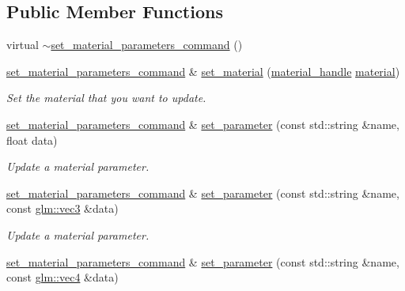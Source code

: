 \subsection*{Public Member Functions}
\begin{DoxyCompactItemize}
\item 
virtual \mbox{\hyperlink{classmoka_1_1set__material__parameters__command_a0b064dd9f44c8a9dbabe5e23edcf632c}{$\sim$set\+\_\+material\+\_\+parameters\+\_\+command}} ()
\item 
\mbox{\hyperlink{classmoka_1_1set__material__parameters__command}{set\+\_\+material\+\_\+parameters\+\_\+command}} \& \mbox{\hyperlink{classmoka_1_1set__material__parameters__command_a94146b37e0add82e19ca6dd254d02fed}{set\+\_\+material}} (\mbox{\hyperlink{structmoka_1_1material__handle}{material\+\_\+handle}} \mbox{\hyperlink{classmoka_1_1material}{material}})
\begin{DoxyCompactList}\small\item\em Set the material that you want to update. \end{DoxyCompactList}\item 
\mbox{\hyperlink{classmoka_1_1set__material__parameters__command}{set\+\_\+material\+\_\+parameters\+\_\+command}} \& \mbox{\hyperlink{classmoka_1_1set__material__parameters__command_ad91e42c050a7acdef5190f820aee5dc0}{set\+\_\+parameter}} (const std\+::string \&name, float data)
\begin{DoxyCompactList}\small\item\em Update a material parameter. \end{DoxyCompactList}\item 
\mbox{\hyperlink{classmoka_1_1set__material__parameters__command}{set\+\_\+material\+\_\+parameters\+\_\+command}} \& \mbox{\hyperlink{classmoka_1_1set__material__parameters__command_a8cc11d17514f90ab4a350bc1a270afbd}{set\+\_\+parameter}} (const std\+::string \&name, const \mbox{\hyperlink{namespacemoka_aed2224bc0e5b79e57a8975ded94ee1aaa97ade28e93c0de60adc075bdbe07ca36}{glm\+::vec3}} \&data)
\begin{DoxyCompactList}\small\item\em Update a material parameter. \end{DoxyCompactList}\item 
\mbox{\hyperlink{classmoka_1_1set__material__parameters__command}{set\+\_\+material\+\_\+parameters\+\_\+command}} \& \mbox{\hyperlink{classmoka_1_1set__material__parameters__command_a7e79231e37e5e7bfc749da230abc4f71}{set\+\_\+parameter}} (const std\+::string \&name, const \mbox{\hyperlink{namespacemoka_aed2224bc0e5b79e57a8975ded94ee1aaa1a9028fd802c481a99491a418ca2fe86}{glm\+::vec4}} \&data)

\end{DoxyCompactItemize}
